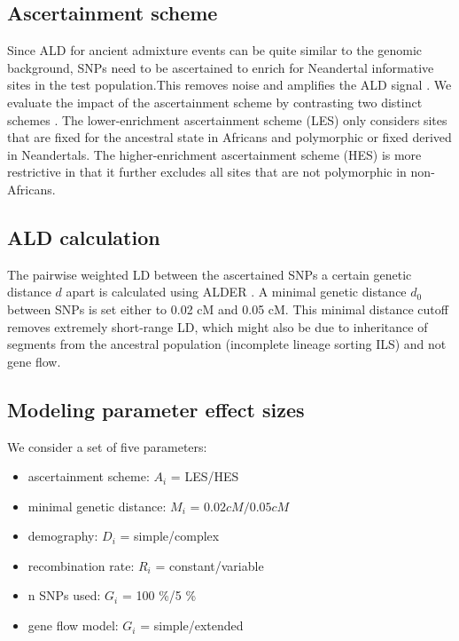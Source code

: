 \documentclass[11pt]{article}
\begin{document}
\subsection{Ascertainment scheme}\label{asceteinment scheme}
Since ALD for ancient admixture events can be quite similar to the genomic background, SNPs need to be ascertained to enrich for
Neandertal informative sites in the test population.This removes noise and
amplifies the ALD signal \citep{sankararaman_date_2012}. 
We evaluate the impact of the ascertainment scheme by contrasting two distinct schemes \citep{sankararaman_date_2012,fu_genome_2014}. The lower-enrichment ascertainment scheme (LES) only considers  sites that are fixed for the ancestral state in
Africans and polymorphic or fixed derived in Neandertals. The higher-enrichment
ascertainment scheme (HES) is more restrictive in that it further excludes all sites that are not polymorphic in non-Africans.

\subsection{ALD calculation}\label{ALD calculation}

The pairwise weighted LD between the ascertained SNPs a certain genetic
distance \(d\) apart is calculated using ALDER
\citep{loh_inferring_2013}. A minimal genetic distance \(d_0\) between
SNPs is set either to 0.02 cM and 0.05 cM. This minimal distance cutoff
removes extremely short-range LD, which might also be due to inheritance of segments from the ancestral population (incomplete lineage sorting ILS) and not gene flow. 




\subsection{Modeling parameter effect sizes}\label{modeling prameter effect sizes}

We consider a set of five parameters:
\begin{itemize} 
    \item ascertainment scheme: $A_i$ = LES/HES
    \item minimal genetic distance: $M_i$ = $0.02 cM/ 0.05 cM$
    \item demography: $D_i$ = simple/complex
    \item recombination rate: $R_i$ = constant/variable
    \item n SNPs used: $G_i$ = 100 \%/5 \%
    \item gene flow model: $G_i$ = simple/extended
\end{itemize}
\end{document}

